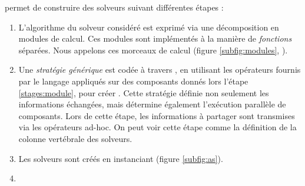 \posl{} permet de construire des solveurs suivant différentes étapes : 
\begin{enumerate}
\item  L'algorithme du solveur considéré est  exprimé via une décomposition  en modules de calcul. Ces modules sont implémentés à la   manière de {\it fonctions} séparées. Nous appelons \INTROom{} ces morceaux de calcul (figure \ref{subfig:modules}, ).  \label{stages:module}

\item  Une {\it stratégie générique}  est codée  à travers  \posl{}, en utilisant les  opérateurs fournis par le langage appliqués  sur des  composants donnés lors l'étape \ref{stages:module}, pour créer \ass. Cette  stratégie   définie  non  seulement  les informations   échangées,  mais   détermine  également   l'exécution parallèle de  composants. Lors  de cette  étape, les  informations à partager sont  transmises via  les opérateurs  ad-hoc. On  peut voir cette étape comme la définition de la colonne vertébrale des solveurs.

\item  Les solveurs sont créés en instanciant  (figure \ref{subfig:as}). %

\item {}
\end{enumerate}

